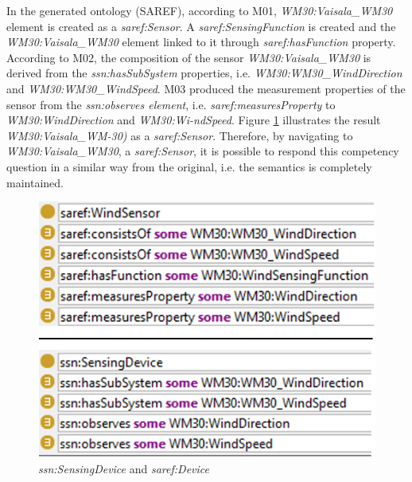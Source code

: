 \documentclass{sig-alternate-05-2015}
\begin{document}
In the generated ontology (SAREF), according to M01, \textit{WM30:\-Vaisala\-\_WM30} element is created as a \textit{saref:\-Sensor}. A \textit{saref:\-SensingFunction} is created and the \textit{WM30:\-Vaisala\-\_WM30} element linked to it through \textit{saref:\-hasFunction} property. According to M02, the composition of the sensor \textit{WM30:\-Vaisala\-\_WM30} is derived from the \textit{ssn:\-hasSubSystem} properties, i.e. \textit{WM30:\-WM30\-\_Wind\-Direction} and \textit{WM30:\-WM30\-\_WindSpeed}. M03 produced the measurement properties of the sensor from the \textit{ssn:\-observes element}, i.e. \textit{saref:\-measuresProperty} to \textit{WM30:\-WindDirection} and \textit{WM30:Wi-ndSpeed}. Figure \ref{fig:SAREF_Sensor_WM30} illustrates the result \textit{WM30:\-Vaisala\-\_WM-30)} as a \textit{saref:\-Sensor}. Therefore, by navigating to \textit{WM30:\-Vaisala\-\_WM30}, a \textit{saref:\-Sensor}, it is possible to respond this competency question in a similar way from the original, i.e. the semantics is completely maintained.  
\begin{figure}[h!]
\centering
\includegraphics[scale=0.53]{WM30_SSNtoSAREF}
\caption{\textit{ssn:SensingDevice} and \textit{saref:Device}}
\label{fig:SAREF_Sensor_WM30}
\end{figure}
\end{document}
